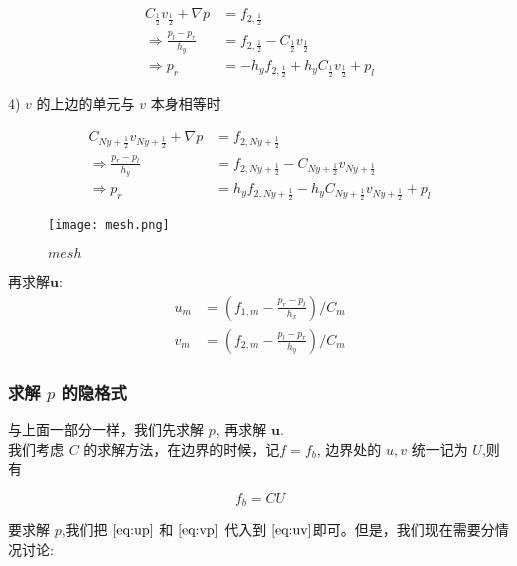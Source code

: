 \documentclass[leqno]{article}
\begin{document}
\begin{equation*}
\begin{aligned}
C_{\frac{1}{2}}v_{\frac{1}{2}} + \nabla p & = f_{2,\frac{1}{2}}\\
\Rightarrow \frac{p_l - p_r}{h_y} & = f_{2,\frac{1}{2}} - C_{\frac{1}{2}}v_{\frac{1}{2}} \\
\Rightarrow p_r & = - h_yf_{2,\frac{1}{2}} + h_yC_{\frac{1}{2}}v_{\frac{1}{2}} + p_l
\end{aligned}
\end{equation*} 

4) $v$ 的上边的单元与 $v$ 本身相等时

\begin{equation*}
\begin{aligned}
C_{Ny+\frac{1}{2}}v_{Ny+\frac{1}{2}} + \nabla p & = f_{2,Ny+\frac{1}{2}}\\
\Rightarrow \frac{p_r - p_l}{h_y} & = f_{2,Ny+\frac{1}{2}} - C_{Ny+\frac{1}{2}}v_{Ny+\frac{1}{2}} \\
\Rightarrow p_r & = h_yf_{2,Ny+\frac{1}{2}} - h_yC_{Ny+\frac{1}{2}}v_{Ny+\frac{1}{2}} + p_l
\end{aligned}
\end{equation*}

\begin{figure}[H] 
\centering 
\texttt{[image: mesh.png]} 
\caption{$mesh$} 
\label{fig:label} 
\end{figure}

再求解$\boldsymbol{u}$:
\begin{equation*}
\begin{aligned}
u_m & = (f_{1,m} - \frac{p_{r} - p_{l}}{h_x})/C_m \\
v_m & = (f_{2,m} - \frac{p_{l} - p_{r}}{h_y})/C_m
\end{aligned}
\end{equation*}
\subsubsection{求解 $p$ 的隐格式}

与上面一部分一样，我们先求解 $p$, 再求解 $\boldsymbol{u}$.\\
我们考虑 $C$ 的求解方法，在边界的时候，记$f = f_b$, 边界处的 $u,v$ 统一记为 $U$,则有

\begin{equation*}
f_b = CU
\end{equation*}

要求解 $p$,我们把 $\eqref{eq:up}$ 和 $\eqref{eq:vp}$ 代入到 $\eqref{eq:uv}$即可。但是，我们现在需要分情况讨论: \\
\end{document}
